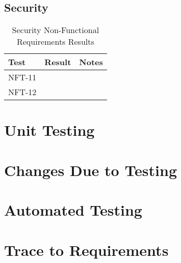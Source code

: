 \documentclass[12pt, titlepage]{article}
\begin{document}
\subsection{Security}

\begin{table}[H]
\centering
    \setlength{\leftmargini}{0.4cm}
    \begin{tabular}{| >{\centering\arraybackslash}m{3cm} | 
      >{\centering\arraybackslash}m{4cm} | 
      >{\centering\arraybackslash}m{6cm} |}
    \hline
    \rowcolor[gray]{0.9}
    Test & Result & Notes\\
    \hline
    NFT-11 &  & \\
    \hline
    NFT-12 &  & \\
    \hline
    \end{tabular}
\caption{Security Non-Functional Requirements Results}
\end{table}

\section{Unit Testing}

\section{Changes Due to Testing}

\section{Automated Testing}
		
\section{Trace to Requirements}
\end{document}
